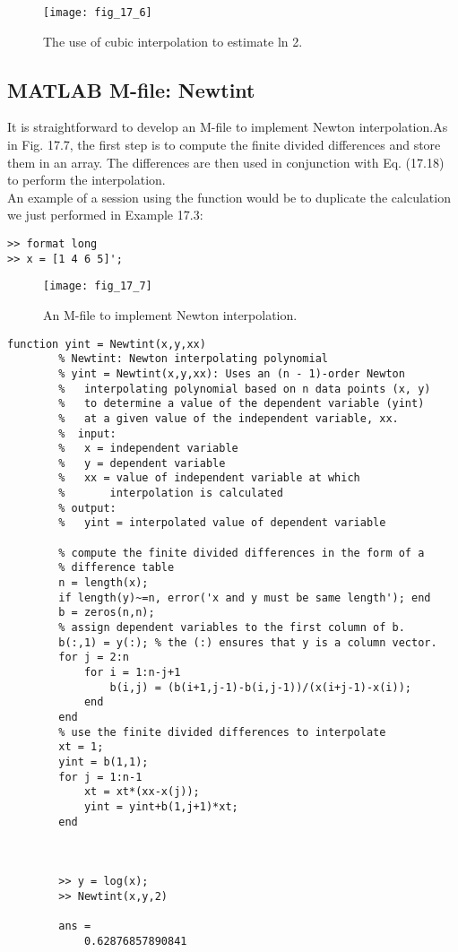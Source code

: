 \documentclass[../main.tex]{subfiles}
\begin{document}
    \begin{figure}[H]
        \centering
        \texttt{[image: fig\_17\_6]}
       \caption{\textsf{The use of cubic interpolation to estimate ln 2.}}\label{fig:fig_17_6}
    \end{figure}

    \subsection{MATLAB M-file: Newtint}
    It is straightforward to develop an M-file to implement Newton interpolation.As in Fig. 17.7,
    the first step is to compute the finite divided differences and store them in an array. The differences are then used in conjunction with Eq. (17.18) to perform the interpolation.\\
    An example of a session using the function would be to duplicate the calculation we
    just performed in Example 17.3:
    
    \begin{lstlisting}[numbers=none]
>> format long
>> x = [1 4 6 5]';
    \end{lstlisting}
    
    \begin{figure}[H]
        \centering
        \texttt{[image: fig\_17\_7]}
       \caption{\textsf{An M-file to implement Newton interpolation.}}\label{fig:fig_17_7}
    \end{figure}

    \begin{lstlisting}[numbers=none]
        function yint = Newtint(x,y,xx)
        % Newtint: Newton interpolating polynomial
        % yint = Newtint(x,y,xx): Uses an (n - 1)-order Newton
        %   interpolating polynomial based on n data points (x, y)
        %   to determine a value of the dependent variable (yint)
        %   at a given value of the independent variable, xx.
        %  input:
        %   x = independent variable
        %   y = dependent variable
        %   xx = value of independent variable at which
        %       interpolation is calculated
        % output:
        %   yint = interpolated value of dependent variable

        % compute the finite divided differences in the form of a
        % difference table
        n = length(x);
        if length(y)~=n, error('x and y must be same length'); end
        b = zeros(n,n);
        % assign dependent variables to the first column of b.
        b(:,1) = y(:); % the (:) ensures that y is a column vector.
        for j = 2:n
            for i = 1:n-j+1
                b(i,j) = (b(i+1,j-1)-b(i,j-1))/(x(i+j-1)-x(i));
            end
        end
        % use the finite divided differences to interpolate
        xt = 1;
        yint = b(1,1);
        for j = 1:n-1
            xt = xt*(xx-x(j));
            yint = yint+b(1,j+1)*xt;
        end



        >> y = log(x);
        >> Newtint(x,y,2)

        ans =
            0.62876857890841
    \end{lstlisting}
\end{document}

